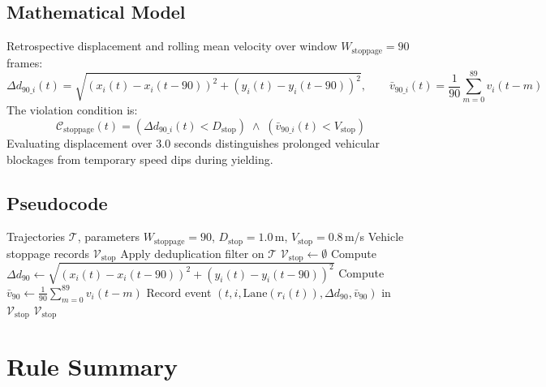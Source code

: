 \subsection{Mathematical Model}
Retrospective displacement and rolling mean velocity over window $W_{\text{stoppage}} = 90$ frames:
\begin{equation}
    \Delta d_{90\_i}(t) = \sqrt{(x_i(t)-x_i(t{-}90))^2 + (y_i(t)-y_i(t{-}90))^2}, \qquad
    \bar{v}_{90\_i}(t) = \frac{1}{90}\sum_{m=0}^{89} v_i(t-m)
\end{equation}
The violation condition is:
\begin{equation}
    \mathcal{C}_{\text{stoppage}}(t) = \left( \Delta d_{90\_i}(t) < D_{\text{stop}} \right) \;\land\; \left( \bar{v}_{90\_i}(t) < V_{\text{stop}} \right)
\end{equation}
Evaluating displacement over 3.0 seconds distinguishes prolonged vehicular blockages from temporary speed dips during yielding.

\subsection{Pseudocode}
\begin{algorithm}[H]
\caption{Vehicle Stoppage Detection Algorithm}
\label{alg:rule5}
\begin{algorithmic}[1]
\Require Trajectories $\mathcal{T}$, parameters $W_{\text{stoppage}} = 90$, $D_{\text{stop}} = 1.0$\,m, $V_{\text{stop}} = 0.8$\,m/s
\Ensure Vehicle stoppage records $\mathcal{V}_{\text{stop}}$
\State Apply deduplication filter on $\mathcal{T}$
\State $\mathcal{V}_{\text{stop}} \gets \emptyset$
        \State Compute $\Delta d_{90} \gets \sqrt{(x_i(t)-x_i(t-90))^2 + (y_i(t)-y_i(t-90))^2}$
        \State Compute $\bar{v}_{90} \gets \frac{1}{90}\sum_{m=0}^{89} v_i(t-m)$
            \State Record event $(t, i, \mathrm{Lane}(r_i(t)), \Delta d_{90}, \bar{v}_{90})$ in $\mathcal{V}_{\text{stop}}$
        \EndIf
    \EndFor
\EndFor
\State \Return $\mathcal{V}_{\text{stop}}$
\end{algorithmic}
\end{algorithm}

\section{Rule Summary}

